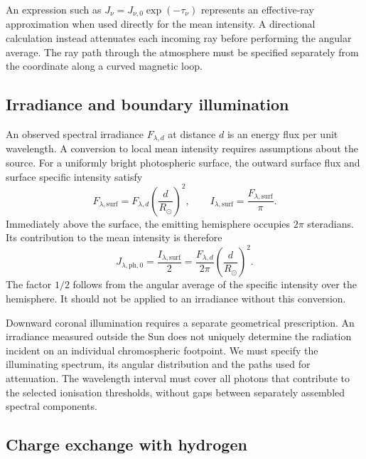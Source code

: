 An expression such as \(J_\nu=J_{\nu,0}\exp(-\tau_\nu)\) represents an
effective-ray approximation when used directly for the mean intensity.
A directional calculation instead attenuates each incoming ray before
performing the angular average. The ray path through the atmosphere must be
specified separately from the coordinate along a curved magnetic loop.

\subsection{Irradiance and boundary illumination}
\label{subsec:ion_boundary_radiation}

An observed spectral irradiance \(F_{\lambda,d}\) at distance \(d\) is an energy
flux per unit wavelength. A conversion to local mean intensity requires
assumptions about the source. For a uniformly bright photospheric surface,
the outward surface flux and surface specific intensity satisfy
\begin{equation}
 F_{\lambda,\mathrm{surf}}
 =F_{\lambda,d}\left(\frac{d}{R_\odot}\right)^2,
 \qquad
 I_{\lambda,\mathrm{surf}}
 =\frac{F_{\lambda,\mathrm{surf}}}{\pi}.
 \label{eq:ion_irradiance_conversion}
\end{equation}
Immediately above the surface, the emitting hemisphere occupies
\(2\pi\) steradians. Its contribution to the mean intensity is therefore
\begin{equation}
 J_{\lambda,\mathrm{ph},0}
 =\frac{I_{\lambda,\mathrm{surf}}}{2}
 =\frac{F_{\lambda,d}}{2\pi}
 \left(\frac{d}{R_\odot}\right)^2.
 \label{eq:ion_photospheric_boundary}
\end{equation}
The factor \(1/2\) follows from the angular average of the specific intensity
over the hemisphere. It should not be applied to an irradiance without this
conversion.

Downward coronal illumination requires a separate geometrical prescription.
An irradiance measured outside the Sun does not uniquely determine the
radiation incident on an individual chromospheric footpoint.
We must specify the illuminating spectrum, its angular distribution and the
paths used for attenuation. The wavelength interval must cover all photons
that contribute to the selected ionisation thresholds, without gaps between
separately assembled spectral components.

\subsection{Charge exchange with hydrogen}
\label{subsec:ion_charge_exchange}

